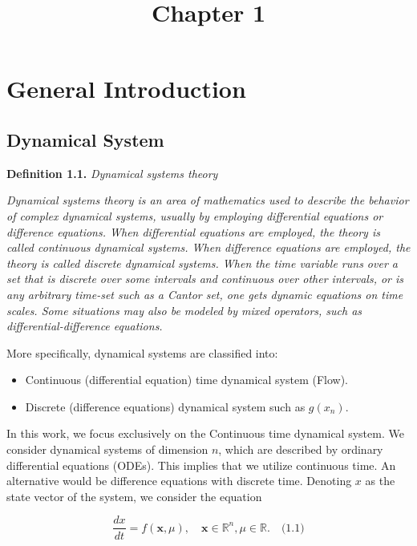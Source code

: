 \documentclass[17pt]{extarticle}
\date{}
\begin{document}
\title{\textbf{Chapter 1}}

\maketitle
\section*{\textbf{General Introduction}}
\vspace{\baselineskip} 
\subsection{Dynamical System}
\noindent \textbf{Definition 1.1.} \textit{Dynamical systems theory}

\noindent \textit {Dynamical systems theory is an area of mathematics used to describe the behavior of complex dynamical systems, usually by employing differential equations or difference equations. When differential equations are employed, the theory is called continuous dynamical systems. When difference equations are employed, the theory is called discrete dynamical systems. When the time variable runs over a set that is discrete over some intervals and continuous over other intervals, or is any arbitrary time-set such as a Cantor set, one gets dynamic equations on time scales. Some situations may also be modeled by mixed operators, such as differential-difference equations.}

More specifically, dynamical systems are classified into:


\newpage 
\begin{itemize}
    \item Continuous (differential equation) time dynamical system (Flow).
    \item Discrete (difference equations) dynamical system such as \(g(x_n)\).
\end{itemize}

In this work, we focus exclusively on the Continuous time dynamical system. We consider dynamical systems of dimension \(n\), which are described by ordinary differential equations (ODEs). This implies that we utilize continuous time. An alternative would be difference equations with discrete time. Denoting \(x\) as the state vector of the system, we consider the equation

$$
\frac{dx}{dt} = f(\mathbf{x}, \mu), \quad \mathbf{x} \in \mathbb{R}^n, \mu \in \mathbb{R}. \quad \text{(1.1)}
$$
\end{document}
